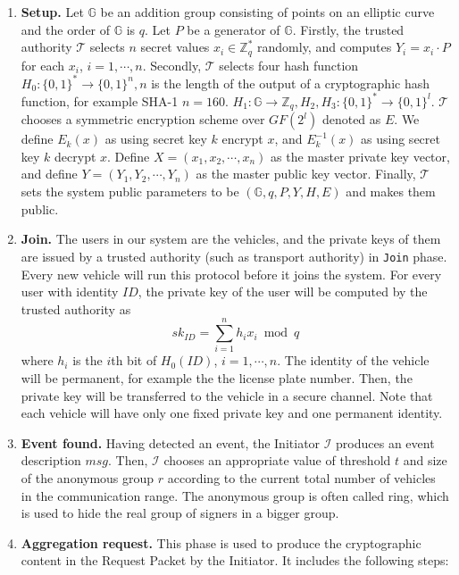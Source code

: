 \documentclass[a4paper]{article}
\begin{document}
\begin{enumerate}
 \item \textbf{Setup.} Let $\mathbb{G}$ be an addition group consisting of points on an elliptic curve and the order of $\mathbb{G}$ is $q$. Let $P$ be a generator of $\mathbb{G}$. Firstly, the trusted authority $\mathcal{T}$ selects $n$ secret values $x_i \in \mathbb{Z}_{q}^{*}$ randomly, and computes $Y_i = {x_i}\cdot P$ for each $x_i$, $i = 1,\cdots, n$. Secondly, $\mathcal{T}$ selects four hash function $H_0 : \{0,1\}^* \rightarrow \{0,1\}^n, n$ is the length of the output of a cryptographic hash function, for example SHA-1 $n = 160$. $H_1 : \mathbb{G} \rightarrow \mathbb{Z}_{q}, H_2, H_3: \{0,1\}^* \rightarrow \{0,1\}^l$. $\mathcal{T}$ chooses a symmetric encryption scheme over $GF(2^l)$ denoted as $E$. We define $E_k(x)$ as using secret key $k$ encrypt $x$, and $E_k^{-1}(x)$ as using secret key $k$ decrypt $x$. Define $X = (x_1,x_2,\cdots, x_n)$ as the master private key vector, and define $Y = (Y_1,Y_2,\cdots, Y_n)$ as the master public key vector. Finally, $\mathcal{T}$ sets the system public parameters to be $(\mathbb{G},q,P,Y,H,E)$ and makes them public.
 \item \textbf{Join.} The users in our system are the vehicles, and the private keys of them are issued by a trusted authority (such as transport authority) in \texttt{Join} phase. Every new vehicle will run this protocol before it joins the system. For every user with identity $ID$, the private key of the user will be computed by the trusted authority as
     \begin{displaymath}
     sk_{ID} = \sum_{i=1}^n h_ix_i \bmod q
     \end{displaymath}
     where $h_i$ is the $i$th bit of $H_0(ID)$, $i = 1,\cdots, n$. The identity of the vehicle will be permanent, for example the the license plate number. Then, the private key will be transferred to the vehicle in a secure channel. Note that each vehicle will have only one fixed private key and one permanent identity.
 \item \textbf{Event found.} Having detected an event, the Initiator $\mathcal{I}$ produces an event description $msg$. Then, $\mathcal{I}$ chooses an appropriate value of threshold $t$ and size of the anonymous group $r$ according to the current total number of vehicles in the communication range. The anonymous group is often called ring, which is used to hide the real group of signers in a bigger group.
 \item \textbf{Aggregation request.} This phase is used to produce the cryptographic content in the Request Packet by the Initiator. It includes the following steps:

\end{enumerate}
\end{document}
